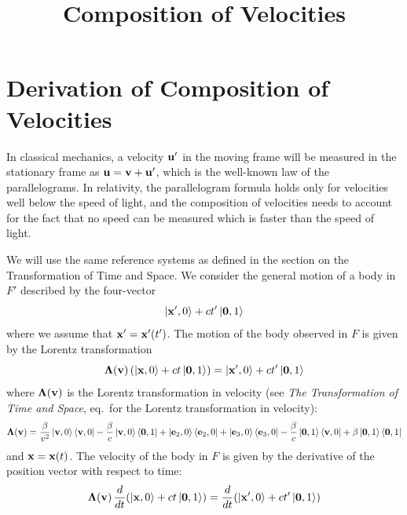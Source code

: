 \documentclass[12pt]{article}
\title{Composition of Velocities}
\author{}
\date{}
\begin{document}
\maketitle

\section{Derivation of Composition of Velocities}

In classical mechanics, a velocity $\vb{u}'$ in the moving frame will be measured in the
stationary frame as $\vb{u} = \vb{v} + \vb{u}'$, which is the well-known law of the
parallelograms. In relativity, the parallelogram formula holds only for velocities well below
the speed of light, and the composition of velocities needs to account for the fact that no
speed can be measured which is faster than the speed of light.

We will use the same reference systems as defined in the section on the Transformation of
Time and Space. We consider the general motion of a body in $F'$ described by the four-vector
\begin{equation}
  \ket{\vb{x}', 0} + ct'\ket{\vb{0}, 1}
\end{equation}
where we assume that $\vb{x}' = \vb{x}'(t')$. The motion of the body observed in $F$ is
given by the Lorentz transformation
\begin{equation}
  \boldsymbol{\Lambda}(\vb{v})\left(\ket{\vb{x}, 0} + ct\ket{\vb{0}, 1}\right)
  = \ket{\vb{x}', 0} + ct'\ket{\vb{0}, 1}
\end{equation}
where $\boldsymbol{\Lambda}(\vb{v})$ is the Lorentz transformation in velocity
(see \textit{The Transformation of Time and Space}, eq.~for the Lorentz transformation in
velocity):
\begin{equation}
  \boldsymbol{\Lambda}(\vb{v}) =
    \frac{\beta}{v^2}\ket{\vb{v},0}\bra{\vb{v},0}
    - \frac{\beta}{c}\ket{\vb{v},0}\bra{\vb{0},1}
    + \ket{\vb{e}_2,0}\bra{\vb{e}_2,0}
    + \ket{\vb{e}_3,0}\bra{\vb{e}_3,0}
    - \frac{\beta}{c}\ket{\vb{0},1}\bra{\vb{v},0}
    + \beta\ket{\vb{0},1}\bra{\vb{0},1}
  \label{eq:composition_Lorentz_in_velocity}
\end{equation}
and $\vb{x} = \vb{x}(t)$. The velocity of the body in $F$ is given by the derivative of the
position vector with respect to time:
\begin{equation}
  \boldsymbol{\Lambda}(\vb{v})\,\frac{d}{dt}\!\left(\ket{\vb{x},0} + ct\ket{\vb{0},1}\right)
  = \frac{d}{dt}\!\left(\ket{\vb{x}',0} + ct'\ket{\vb{0},1}\right)
\end{equation}
\end{document}
